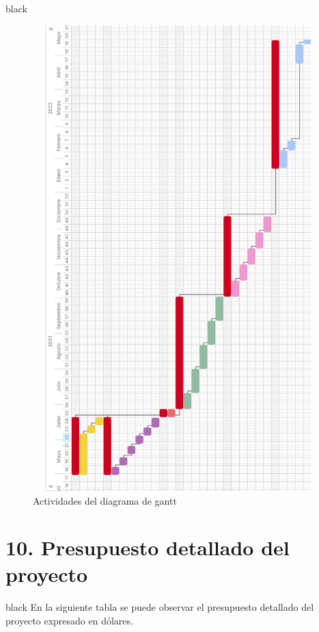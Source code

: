 \documentclass[
11pt, %
codirector, %
]{charter}
\begin{document}
\begin{consigna}{black}
\begin{figure}[htpb]
\centering 
\includegraphics[width=16cm, height=18cm]{./Figuras/digrama de gantt.png}
\caption{Actividades del diagrama de gantt}
\label{fig:AoN}
\end{figure}

\end{consigna}


\section{10. Presupuesto detallado del proyecto}
\label{sec:presupuesto}

\begin{consigna}{black}
En la siguiente tabla se puede observar el presupuesto detallado del proyecto expresado en
dólares.
\end{consigna}
\end{document}
